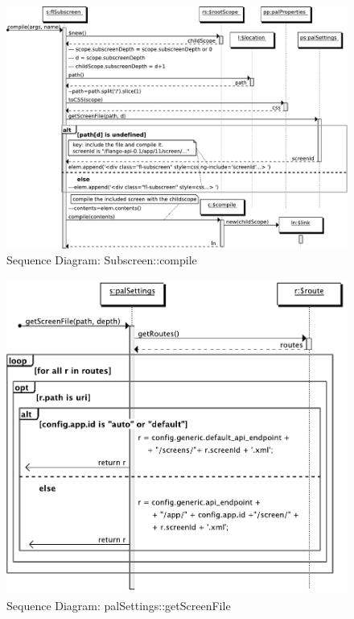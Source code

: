 \begin{figure}
    \centering
    \includegraphics{figures/design/seqdia/subscreen-compile.pdf}
    \caption{Sequence Diagram: Subscreen::compile}
    \label{fig:design-seqdia-subscreen-compile}
\end{figure}

\begin{figure}[htb]
    \centering
    \includegraphics{figures/design/seqdia/palSettings-getScreenFile.pdf}
    \caption{Sequence Diagram: palSettings::getScreenFile}
    \label{fig:design-seqdia-palsettings-getscreenfile}
\end{figure}

